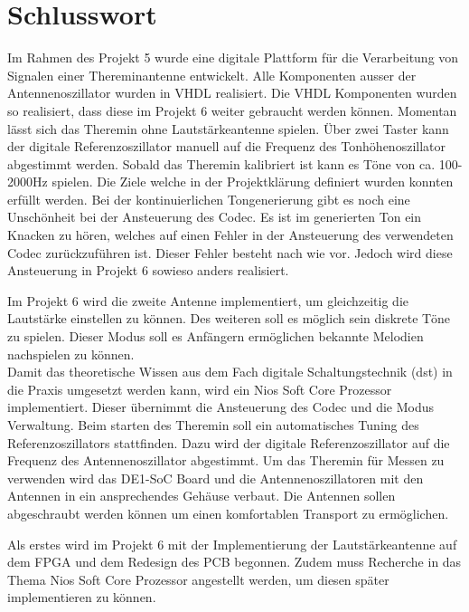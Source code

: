 \clearpage
\section{Schlusswort}\label{sec:Schlusswort}
Im Rahmen des Projekt 5  wurde eine digitale Plattform für die Verarbeitung von Signalen einer Thereminantenne entwickelt. Alle Komponenten ausser der Antennenoszillator wurden in VHDL realisiert. Die VHDL Komponenten wurden so realisiert, dass diese im Projekt 6 weiter gebraucht werden können.
Momentan lässt sich das Theremin ohne Lautstärkeantenne spielen. Über zwei Taster kann der digitale Referenzoszillator manuell auf die Frequenz des Tonhöhenoszillator abgestimmt werden. Sobald das Theremin kalibriert ist kann es Töne von ca. 100-2000Hz spielen. 
Die Ziele welche in der Projektklärung definiert wurden konnten erfüllt werden. Bei der kontinuierlichen Tongenerierung gibt es noch eine Unschönheit bei der Ansteuerung des Codec. Es ist im generierten Ton ein Knacken zu hören, welches auf einen Fehler in der Ansteuerung des verwendeten Codec zurückzuführen ist. Dieser Fehler besteht nach wie vor. Jedoch wird diese Ansteuerung in Projekt 6 sowieso anders realisiert.

Im Projekt 6 wird die zweite Antenne implementiert, um gleichzeitig die Lautstärke einstellen zu können. Des weiteren soll es möglich sein diskrete Töne zu spielen. Dieser Modus soll es Anfängern ermöglichen bekannte Melodien nachspielen zu können. \\
Damit das theoretische Wissen aus dem Fach digitale Schaltungstechnik (dst) in die Praxis umgesetzt werden kann, wird ein Nios Soft Core Prozessor implementiert. Dieser übernimmt die Ansteuerung des Codec und die Modus Verwaltung. Beim starten des Theremin soll ein automatisches Tuning des Referenzoszillators stattfinden. Dazu wird der digitale Referenzoszillator auf die Frequenz des Antennenoszillator abgestimmt. Um das Theremin für Messen zu verwenden wird das DE1-SoC Board und die Antennenoszillatoren mit den Antennen in ein ansprechendes Gehäuse verbaut. Die Antennen sollen abgeschraubt werden können um einen komfortablen Transport zu ermöglichen.

Als erstes wird im Projekt 6 mit der Implementierung der Lautstärkeantenne auf dem FPGA und dem Redesign des PCB begonnen. Zudem muss Recherche in das Thema Nios Soft Core Prozessor angestellt werden, um diesen später implementieren zu können. 






